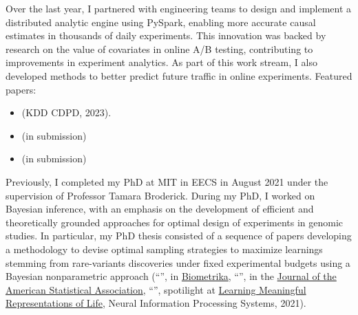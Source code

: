 \documentclass[10pt, a4paper]{article}
\begin{document}
\begin{itemize}
{    Over the last year, I partnered with engineering teams to design and implement a distributed analytic engine using PySpark, enabling more accurate causal estimates in thousands of daily experiments. 
     This innovation was backed by research on the value of covariates in online A/B testing, contributing to improvements in experiment analytics.
     As part of this work stream, I also developed methods to better predict future traffic in online experiments. Featured papers:}
     \small{
    \begin{itemize}
        \item  \href{https://proceedings.mlr.press/v218/masoero23a.html}{\color{blue}{Leveraging Covariate Adjustments at Scale in Online A/B Testing}} (KDD CDPD, 2023).
        \item \href{https://arxiv.org/pdf/2402.03231}{\color{blue}{Improved prediction of future online activity in online A/B testing}} (in submission)
        \item \href{https://arxiv.org/abs/2401.14722}{\color{blue}{A Nonparametric Bayes Approach to Online Activity Prediction}} (in submission)
    \end{itemize}
    }
\end{itemize}

Previously, I completed my PhD at MIT in EECS in August 2021 under the supervision of Professor Tamara Broderick. 
During my PhD, I worked on Bayesian inference, with an emphasis on the development of efficient and theoretically grounded approaches for optimal design of experiments in genomic studies. In particular, my PhD thesis consisted of a sequence of papers developing a methodology to devise optimal sampling strategies to maximize learnings stemming from rare-variants discoveries under fixed experimental budgets  using a Bayesian nonparametric approach (``\href{https://academic.oup.com/biomet/article-abstract/109/1/17/6146908?redirectedFrom=fulltext}{\color{blue}{More for Less: Predicting and maximizing genetic variant discovery via Bayesian nonparametrics}}'', in \href{https://academic.oup.com/biomet/advance-article-abstract/doi/10.1093/biomet/asab012/6146908?redirectedFrom=PDF}{Biometrika}, ``\href{https://www.tandfonline.com/doi/full/10.1080/01621459.2022.2115918}{\color{blue}{Scaled process priors: Improved predictions and uncertainties for new-feature counts via random scaling in Bayesian nonparametrics}}'', in the \href{https://www.tandfonline.com/doi/full/10.1080/01621459.2022.2115918}{Journal of the American Statistical Association},  ``\href{https://arxiv.org/abs/2112.02032}{\color{blue}{Bayesian nonparametric strategies for power maximization in rare variants association studies}}'', spotilight at \href{https://www.lmrl.org/}{Learning Meaningful Representations of Life},  Neural Information Processing Systems, 2021).
%
\end{document}
